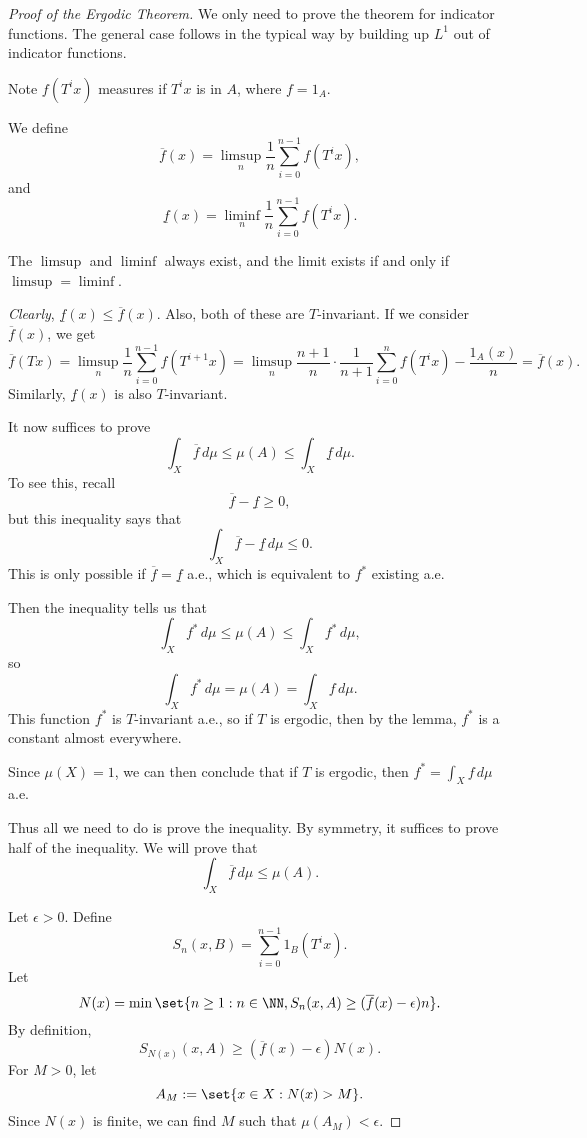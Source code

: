 \documentclass{article}
\newcommand\oln\overline
\newcommand\uln\underline
\theoremstyle{remark}
\begin{document}
\begin{proof}[Proof of the Ergodic Theorem]
    We only need to prove the theorem for indicator functions.
    The general case follows in the typical way by building up 
    $L^1$ out of indicator functions.

    Note $f(T^ix)$ measures if $T^ix$ is in $A$, where $f=1_A$.

    We define 
    \[\oln{f}(x) = \limsup_n 
    \frac{1}{n} \sum_{i=0}^{n-1} f(T^ix),
    \]
    and
    \[\uln{f}(x) = \liminf_n 
    \frac{1}{n} \sum_{i=0}^{n-1} f(T^ix).
    \]
    
    The $\limsup$ and $\liminf$ always exist, and the limit 
    exists if and only if $\limsup = \liminf$.

    \emph{Clearly}, $\uln{f}(x) \le \oln{f}(x)$.
    Also, both of these are $T$-invariant.
    If we consider $\oln{f}(x)$, we get
    \[\oln{f}(Tx) = 
    \limsup_n 
    \frac{1}{n} 
    \sum_{i=0}^{n-1}f(T^{i+1}x)
    =
    \limsup_n 
    \frac{n+1}{n}
    \cdot 
    \frac{1}{n+1} 
    \sum_{i=0}^{n}f(T^{i}x)
    -\frac{1_A(x)}{n}
    =\oln{f}(x).
    \]
    Similarly, $\uln{f}(x)$ is also $T$-invariant.

    It now suffices to prove 
    \[\int_X \oln{f}\,d\mu \le \mu(A) \le 
    \int_X \uln{f} \,d\mu. \tag{*}\label{eqn:key-ineq} \]
    To see this, recall
    \[ \oln{f} -\uln{f} \ge 0,\]
    but this inequality says that 
    \[\int_X \oln{f} -\uln{f} \,d\mu \le 0.\]
    This is only possible if $\oln{f}=\uln{f}$ a.e.,
    which is equivalent to $f^*$ existing a.e.

    Then the inequality tells us that 
    \[\int_X f^* \,d\mu \le \mu(A) \le 
    \int_X f^* \,d\mu, \]
    so 
    \[ \int_X f^*\,d\mu = \mu(A) = \int_X f \, d\mu.\]
    This function $f^*$ is $T$-invariant a.e., so if $T$ is 
    ergodic, then by the lemma, $f^*$ is a constant almost 
    everywhere.

    Since $\mu(X)=1$, we can then conclude that if $T$ is ergodic,
    then $f^*=\int_X f\,d\mu$ a.e.

    Thus all we need to do is prove the inequality.
    By symmetry, it suffices to prove half of the inequality.
    We will prove that
    \[\int_X \oln{f} \,d\mu \le \mu(A).\]

    Let $\epsilon > 0$. 
    Define 
    \[ S_n(x,B)= \sum_{i=0}^{n-1} 1_B(T^ix). \]
    Let 
    \[ N(x) =
    \min\set{n\ge 1 : n\in\NN, 
    S_n(x,A) \ge (\oln{f}(x)-\epsilon)n}.
    \]
    By definition, 
    \[S_{N(x)}(x,A) \ge (\oln{f}(x)-\epsilon) N(x).\]
    For $M>0$, let 
    \[ A_M := \set{x\in X: N(x) > M}. \]
    Since $N(x)$ is finite, we can find $M$ such that 
    $\mu(A_M) < \epsilon$.


\end{proof}
\end{document}
